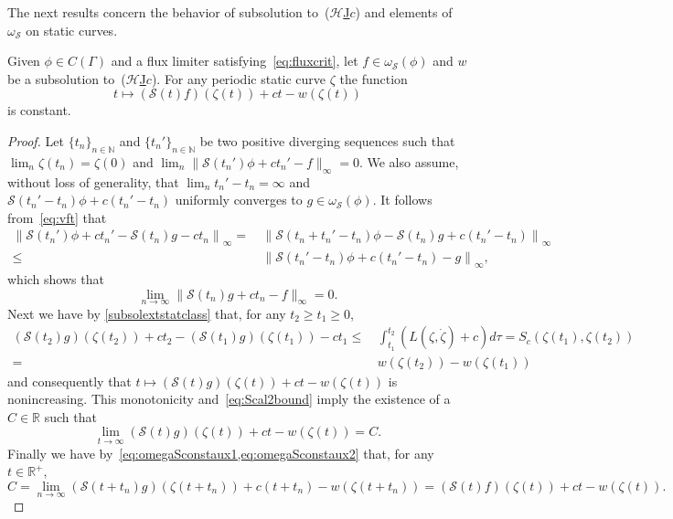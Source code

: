 \documentclass[11pt,a4paper,american]{article}
\newcommand{\Hcal}{\mathcal H}
\newcommand{\Nds}{\mathds N}
\newcommand{\Rds}{\mathds R}
\newcommand{\Scal}{\mathcal S}
\newcommand{\hrefc}{\textup{(}\hyperref[eq:globeik]{\ensuremath{\Hcal}\textup{J}\ensuremath{c}}\textup{)}}
\begin{document}
    The next results concern the behavior of subsolution to~\hrefc{} and elements of $\omega_\Scal$ on static curves.

    \begin{lem}\label{omegaSconstaux}
        Given $\phi\in C(\Gamma)$ and a flux limiter satisfying~\cref{eq:fluxcrit}, let $f\in\omega_\Scal(\phi)$ and $w$ be a subsolution to~\hrefc{}. For any periodic static curve $\zeta$ the function
        \begin{equation*}
            t\longmapsto(\Scal(t)f)(\zeta(t))+ct-w(\zeta(t))
        \end{equation*}
        is constant.
    \end{lem}
    \begin{proof}
        Let $\{t_n\}_{n\in\Nds}$ and $\{t_n'\}_{n\in\Nds}$ be two positive diverging sequences such that $\lim_n\zeta(t_n)=\zeta(0)$ and $\lim_n\|\Scal(t_n')\phi+ct_n'-f\|_\infty=0$. We also assume, without loss of generality, that $\lim_n t_n'-t_n=\infty$ and $\Scal(t_n'-t_n)\phi+c(t_n'-t_n)$ uniformly converges to $g\in\omega_\Scal(\phi)$. It follows from~\cref{eq:vft} that
        \begin{align*}
            \left\|\Scal\left(t_n'\right)\phi+ct_n'-\Scal(t_n)g-ct_n\right\|_\infty=&\,\left\|\Scal\left(t_n+t_n'-t_n\right)\phi-\Scal(t_n)g+c\left(t_n'-t_n\right)\right\|_\infty\\
            \le&\,\left\|\Scal\left(t_n'-t_n\right)\phi+c\left(t_n'-t_n\right)-g\right\|_\infty,
        \end{align*}
        which shows that
        \begin{equation}\label{eq:omegaSconstaux1}
            \lim_{n\to\infty}\|\Scal(t_n)g+ct_n-f\|_\infty=0.
        \end{equation}
        Next we have by \cref{subsolextstatclass} that, for any $t_2\ge t_1\ge0$,
        \begin{align*}
            (\Scal(t_2)g)(\zeta(t_2))+ct_2-(\Scal(t_1)g)(\zeta(t_1))-ct_1\le&\,\int_{t_1}^{t_2}\left(L\left(\zeta,\dot\zeta\right)+c\right)d\tau=S_c(\zeta(t_1),\zeta(t_2))\\
            =&\,w(\zeta(t_2))-w(\zeta(t_1))
        \end{align*}
        and consequently that $t\mapsto(\Scal(t)g)(\zeta(t))+ct-w(\zeta(t))$ is nonincreasing. This monotonicity and~\cref{eq:Scal2bound} imply the existence of a $C\in\Rds$ such that
        \begin{equation}\label{eq:omegaSconstaux2}
            \lim_{t\to\infty}(\Scal(t)g)(\zeta(t))+ct-w(\zeta(t))=C.
        \end{equation}
        Finally we have by~\cref{eq:omegaSconstaux1,eq:omegaSconstaux2} that, for any $t\in\Rds^+$,
        \begin{equation*}
            C=\lim_{n\to\infty}(\Scal(t+t_n)g)(\zeta(t+t_n))+c(t+t_n)-w(\zeta(t+t_n))=(\Scal(t)f)(\zeta(t))+ct-w(\zeta(t)).
        \end{equation*}
    \end{proof}
\end{document}
